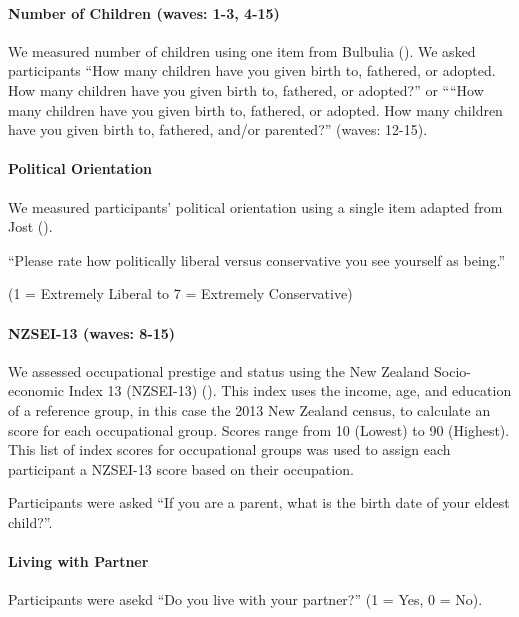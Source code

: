 \documentclass[
  singlecolumn,
  9pt]{article}
\let\oldparagraph\paragraph
\renewcommand{\paragraph}[1]{\oldparagraph{#1}\mbox{}}
\begin{document}
\paragraph{Number of Children (waves: 1-3,
4-15)}\label{number-of-children-waves-1-3-4-15}

We measured number of children using one item from Bulbulia
(). We asked participants ``How many
children have you given birth to, fathered, or adopted. How many
children have you given birth to, fathered, or adopted?'' or ````How
many children have you given birth to, fathered, or adopted. How many
children have you given birth to, fathered, and/or parented?'' (waves:
12-15).

\paragraph{Political Orientation}\label{political-orientation}

We measured participants' political orientation using a single item
adapted from Jost ().

``Please rate how politically liberal versus conservative you see
yourself as being.''

(1 = Extremely Liberal to 7 = Extremely Conservative)

\paragraph{NZSEI-13 (waves: 8-15)}\label{nzsei-13-waves-8-15}

We assessed occupational prestige and status using the New Zealand
Socio-economic Index 13 (NZSEI-13) (). This index uses the income, age, and education of
a reference group, in this case the 2013 New Zealand census, to
calculate an score for each occupational group. Scores range from 10
(Lowest) to 90 (Highest). This list of index scores for occupational
groups was used to assign each participant a NZSEI-13 score based on
their occupation.

Participants were asked ``If you are a parent, what is the birth date of
your eldest child?''.

\paragraph{Living with Partner}\label{living-with-partner}

Participants were asekd ``Do you live with your partner?'' (1 = Yes, 0 =
No).
\end{document}
